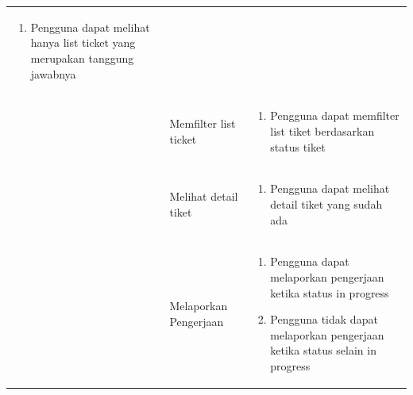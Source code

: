 \documentclass[12pt]{article}
\begin{document}
\begin{enumerate}[label=\textbf{5.\arabic*.}]
\begin{enumerate}[label=\textbf{5.2.\arabic*.}]
\begin{longtable}{ |l|l|p{}| }
\begin{enumerate}[label=\arabic*.]
                                                                \item Pengguna dapat melihat hanya list ticket yang merupakan tanggung jawabnya 
                                                            \end{enumerate}\\\cline{2-3}
                                & Memfilter list ticket & \begin{enumerate}[label=\arabic*.]
                                                                \item Pengguna dapat memfilter list tiket berdasarkan status tiket  
                                                            \end{enumerate}\\\cline{2-3}
                                & Melihat detail tiket  & \begin{enumerate}[label=\arabic*.]
                                                                \item Pengguna dapat melihat detail tiket yang sudah ada 
                                                            \end{enumerate}\\\cline{2-3}
                                & Melaporkan Pengerjaan & \begin{enumerate}[label=\arabic*.]
                                                                \item Pengguna dapat melaporkan pengerjaan ketika status in progress
                                                                \item Pengguna tidak dapat melaporkan pengerjaan ketika status selain in progress
                                                            \end{enumerate}\\\cline{2-3}
            \hline


\end{longtable}
\end{enumerate}
\end{enumerate}
\end{document}
